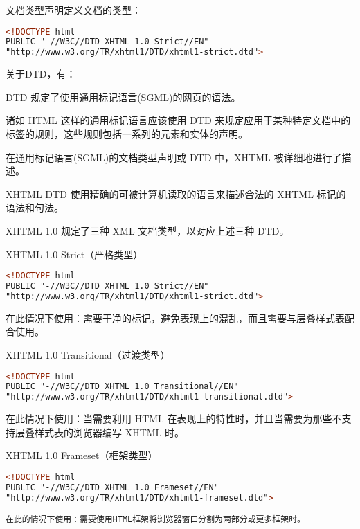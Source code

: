文档类型声明定义文档的类型：

\begin{lstlisting}[language=HTML]
<!DOCTYPE html
PUBLIC "-//W3C//DTD XHTML 1.0 Strict//EN"
"http://www.w3.org/TR/xhtml1/DTD/xhtml1-strict.dtd">
\end{lstlisting}

关于DTD，有：

\begin{compactitem}
\item DTD 规定了使用通用标记语言(SGML)的网页的语法。
\item 诸如 HTML 这样的通用标记语言应该使用 DTD 来规定应用于某种特定文档中的标签的规则，这些规则包括一系列的元素和实体的声明。
\item 在通用标记语言(SGML)的文档类型声明或 DTD 中，XHTML 被详细地进行了描述。
\item XHTML DTD 使用精确的可被计算机读取的语言来描述合法的 XHTML 标记的语法和句法。
\end{compactitem}

XHTML 1.0 规定了三种 XML 文档类型，以对应上述三种 DTD。

\begin{compactenum}
\item XHTML 1.0 Strict（严格类型）

\begin{lstlisting}[language=HTML]
<!DOCTYPE html
PUBLIC "-//W3C//DTD XHTML 1.0 Strict//EN" 
"http://www.w3.org/TR/xhtml1/DTD/xhtml1-strict.dtd">
\end{lstlisting}

在此情况下使用：需要干净的标记，避免表现上的混乱，而且需要与层叠样式表配合使用。

\item XHTML 1.0 Transitional（过渡类型）
\begin{lstlisting}[language=HTML]
<!DOCTYPE html
PUBLIC "-//W3C//DTD XHTML 1.0 Transitional//EN"
"http://www.w3.org/TR/xhtml1/DTD/xhtml1-transitional.dtd">
\end{lstlisting}

在此情况下使用：当需要利用 HTML 在表现上的特性时，并且当需要为那些不支持层叠样式表的浏览器编写 XHTML 时。

\item XHTML 1.0 Frameset（框架类型）

\begin{lstlisting}[language=HTML]
<!DOCTYPE html
PUBLIC "-//W3C//DTD XHTML 1.0 Frameset//EN"
"http://www.w3.org/TR/xhtml1/DTD/xhtml1-frameset.dtd">

在此的情况下使用：需要使用HTML框架将浏览器窗口分割为两部分或更多框架时。
\end{lstlisting}
\end{compactenum}

